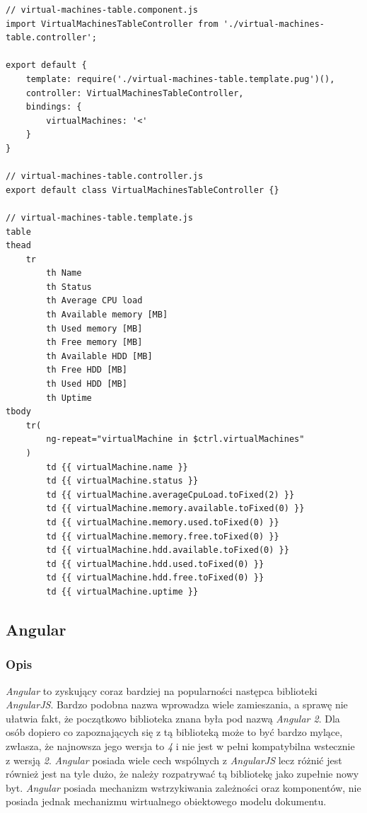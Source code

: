 \documentclass[polish, twoside, 12pt]{mwart}
\begin{document}
\begin{lstlisting}[caption=Komponent tabeli]
// virtual-machines-table.component.js
import VirtualMachinesTableController from './virtual-machines-table.controller';

export default {
    template: require('./virtual-machines-table.template.pug')(),
    controller: VirtualMachinesTableController,
    bindings: {
        virtualMachines: '<'
    }
}

// virtual-machines-table.controller.js
export default class VirtualMachinesTableController {}

// virtual-machines-table.template.js
table
thead
    tr
        th Name
        th Status
        th Average CPU load
        th Available memory [MB]
        th Used memory [MB]
        th Free memory [MB]
        th Available HDD [MB]
        th Free HDD [MB]
        th Used HDD [MB]
        th Uptime
tbody
    tr(
        ng-repeat="virtualMachine in $ctrl.virtualMachines"
    )
        td {{ virtualMachine.name }}
        td {{ virtualMachine.status }}
        td {{ virtualMachine.averageCpuLoad.toFixed(2) }}
        td {{ virtualMachine.memory.available.toFixed(0) }}
        td {{ virtualMachine.memory.used.toFixed(0) }}
        td {{ virtualMachine.memory.free.toFixed(0) }}
        td {{ virtualMachine.hdd.available.toFixed(0) }}
        td {{ virtualMachine.hdd.used.toFixed(0) }}
        td {{ virtualMachine.hdd.free.toFixed(0) }}
        td {{ virtualMachine.uptime }}
\end{lstlisting}

\subsection{Angular}

\subsubsection{Opis}

\emph{Angular} to zyskujący coraz bardziej na popularności następca biblioteki \emph{AngularJS}. Bardzo podobna nazwa wprowadza wiele zamieszania, a sprawę nie ułatwia fakt, że początkowo biblioteka znana była pod nazwą \emph{Angular 2}. Dla osób dopiero co zapoznających się z tą biblioteką może to być bardzo mylące, zwłasza, że najnowsza jego wersja to \emph{4} i nie jest w pełni kompatybilna wstecznie z wersją \emph{2}. \emph{Angular} posiada wiele cech wspólnych z \emph{AngularJS} lecz różnić jest również jest na tyle dużo, że należy rozpatrywać tą bibliotekę jako zupełnie nowy byt. \emph{Angular} posiada mechanizm wstrzykiwania zależności oraz komponentów, nie posiada jednak mechanizmu wirtualnego obiektowego modelu dokumentu.
\end{document}
